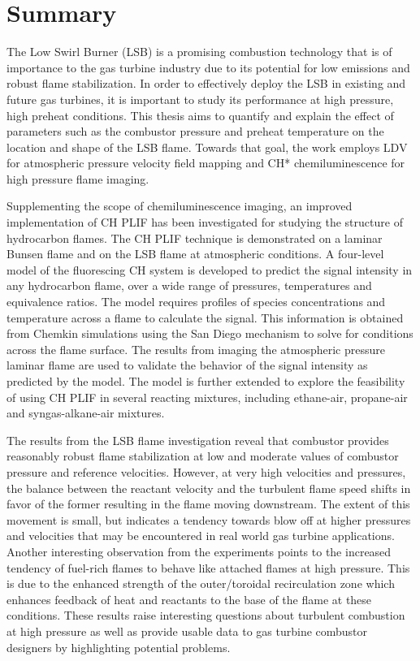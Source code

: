\chapter*{Summary}

The Low Swirl Burner (LSB) is a promising combustion technology that is of importance to the gas turbine industry due to its potential for low  emissions and robust flame stabilization.
In order to effectively deploy the LSB in existing and future gas turbines, it is important to study its performance at high pressure, high preheat conditions.
This thesis aims to quantify and explain the effect of parameters such as the combustor pressure and preheat temperature on the location and shape of the LSB flame.
Towards that goal, the work employs LDV for atmospheric pressure velocity field mapping and CH* chemiluminescence for high pressure flame imaging.

Supplementing the scope of chemiluminescence imaging, an improved implementation of CH PLIF has been investigated for studying the structure of hydrocarbon flames.
The CH PLIF technique is demonstrated on a laminar Bunsen flame and on the LSB flame at atmospheric conditions.
A four-level model of the fluorescing CH system is developed to predict the signal intensity in any hydrocarbon flame, over a wide range of pressures, temperatures and equivalence ratios.
The model requires profiles of species concentrations and temperature across a flame to calculate the signal.
This information is obtained from Chemkin simulations using the San Diego mechanism to solve for conditions across the flame surface.
The results from imaging the atmospheric pressure laminar flame are used to validate the behavior of the signal intensity as predicted by the model.
The model is further extended to explore the feasibility of using CH PLIF in several reacting mixtures, including ethane-air, propane-air and syngas-alkane-air mixtures.

The results from the LSB flame investigation reveal that combustor provides reasonably robust flame stabilization at low and moderate values of combustor pressure and reference velocities.
However, at very high velocities and pressures, the balance between the reactant velocity and the turbulent flame speed shifts in favor of the former resulting in the flame moving downstream.
The extent of this movement is small, but indicates a tendency towards blow off at higher pressures and velocities that may be encountered in real world gas turbine applications.
Another interesting observation from the experiments points to the increased tendency of fuel-rich flames to behave like attached flames at high pressure.
This is due to the enhanced strength of the outer/toroidal recirculation zone which enhances feedback of heat and reactants to the base of the flame at these conditions.
These results raise interesting questions about turbulent combustion at high pressure as well as provide usable data to gas turbine combustor designers by highlighting potential problems.


